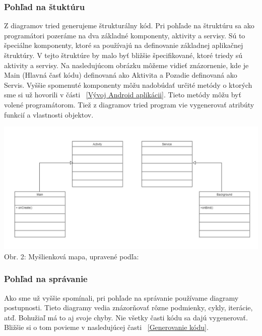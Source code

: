 \documentclass[10pt,twoside,slovak,a4paper]{article}
\begin{document}
\subsubsection{Pohľad na štuktúru}\label{MDE spôsob pre Android:Modelovanie:Pohľad na štuktúru}
Z diagramov tried generujeme štrukturálny kód. Pri pohľade na štruktúru sa ako programátori pozeráme na dva základné komponenty,  aktivity a servisy. Sú to špeciálne komponenty, ktoré sa používajú na definovanie základnej aplikačnej štruktúry. V tejto štruktúre by malo byť bližšie špecifikované, ktoré triedy sú aktivity a servisy. Na nasledujúcom obrázku môžeme vidieť znázornenie, kde je Main (Hlavná časť kódu) definovaná ako Aktivita a Pozadie definovaná ako Servis. \newline
Vyššie spomenuté komponenty môžu nadobúdať určité metódy o ktorých sme si už hovorili v části ~\ref{Vývoj Android aplikácii}. Tieto metódy môžu byť volené programátorom.\newline
Tiež z diagramov tried program vie vygenerovať atribúty funkcií a vlastnosti objektov.\cite{GenerovanieAndroid}\cite{GenerovanieJava}
\begin{center}
\includegraphics[scale=0.5]{diagram.png}
Obr. 2: Myšlienková mapa, upravené podľa:\cite{GenerovanieAndroid}
\end{center}

\subsubsection{Pohľad na správanie}\label{MDE spôsob pre Android:Modelovanie:Pohľad na správanie}
Ako sme už vyššie spomínali, pri pohľade na správanie používame diagramy postupnosti. Tieto diagramy vedia znázorňovať rôzne podmienky, cykly, iterácie, atď. Bohužiaľ má to aj svoje chyby. Nie všetky časti kódu sa dajú vygenerovať. Bližšie si o tom povieme v nasledujúcej časti ~\ref{Generovanie kódu}.\cite{GenerovanieAndroid} \cite{GenerovanieJava}
\end{document}
